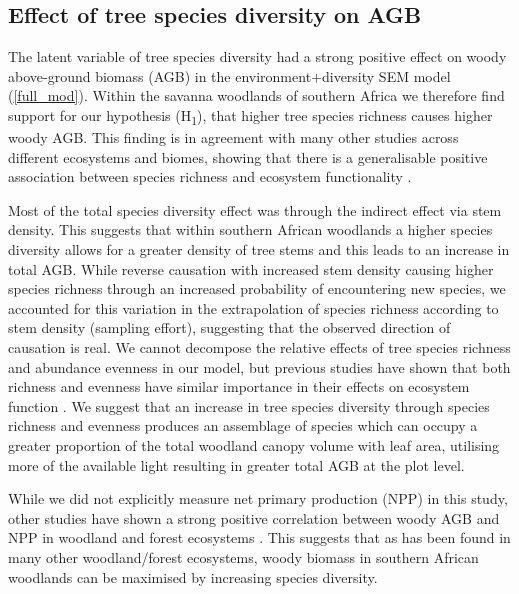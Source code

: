 \documentclass[11pt,a4paper]{article}
\begin{document}
\subsection{Effect of tree species diversity on AGB}

The latent variable of tree species diversity had a strong positive effect on woody above-ground biomass (AGB) in the environment+diversity SEM model (\autoref{full_mod}). Within the savanna woodlands of southern Africa we therefore find support for our hypothesis (H\textsubscript{1}), that higher tree species richness causes higher woody AGB. This finding is in agreement with many other studies across different ecosystems and biomes, showing that there is a generalisable positive association between species richness and ecosystem functionality \citep{Liang2016, Cardinale2009}. 

Most of the total species diversity effect was through the indirect effect via stem density. This suggests that within southern African woodlands a higher species diversity allows for a greater density of tree stems and this leads to an increase in total AGB. While reverse causation with increased stem density causing higher species richness through an increased probability of encountering new species, we accounted for this variation in the extrapolation of species richness according to stem density (sampling effort), suggesting that the observed direction of causation is real. We cannot decompose the relative effects of tree species richness and abundance evenness in our model, but previous studies have shown that both richness and evenness have similar importance in their effects on ecosystem function \citep{Valery2009, Zhang2012}. We suggest that an increase in tree species diversity through species richness and evenness produces an assemblage of species which can occupy a greater proportion of the total woodland canopy volume with leaf area, utilising more of the available light resulting in greater total AGB at the plot level. 


While we did not explicitly measure net primary production (NPP) in this study, other studies have shown a strong positive correlation between woody AGB and NPP in woodland and forest ecosystems \citep{Chisholm2013, Prado-Junior2016}. This suggests that as has been found in many other woodland/forest ecosystems, woody biomass in southern African woodlands can be maximised by increasing species diversity. 
\end{document}
